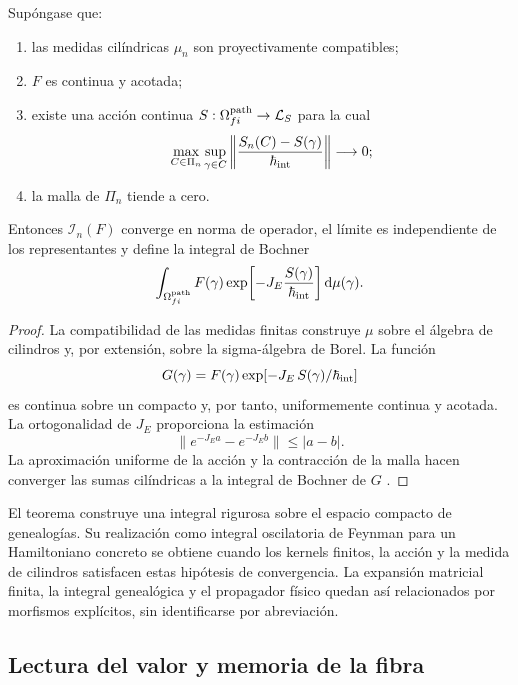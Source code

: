 \begin{theorem}
\label{x_reciprocidad:thm:integral-genealogica-caminos-rev2}
Supóngase que:
\begin{enumerate}
 \item las medidas cilíndricas \(\mu_n\) son proyectivamente compatibles;
 \item \(F\) es continua y acotada;
 \item existe una acción continua
 \(S:\Omega^{\rm path}_{fi}\to\mathcal L_S\) para la cual
 \[
  \max_{C\in\Pi_n}\sup_{\gamma\in C}
  \left\|\frac{S_n(C)-S(\gamma)}{\hbar_{\rm int}}\right\|
  \longrightarrow0;
 \]
 \item la malla de \(\Pi_n\) tiende a cero.
\end{enumerate}
Entonces \(\mathcal I_n(F)\) converge en norma de operador, el límite es
independiente de los representantes y define la integral de Bochner
\begin{equation}
 \int_{\Omega^{\rm path}_{fi}}
 F(\gamma)
 \exp\!\left[-J_E\frac{S(\gamma)}{\hbar_{\rm int}}\right]
 \mathrm d\mu(\gamma).
 \label{x_reciprocidad:eq:integral-genealogica-caminos-rev2}
\end{equation}
\end{theorem}

\begin{proof}
La compatibilidad de las medidas finitas construye \(\mu\) sobre el álgebra
de cilindros y, por extensión, sobre la sigma-álgebra de Borel. La función
\[
 G(\gamma)=F(\gamma)
 \exp[-J_E\,S(\gamma)/\hbar_{\rm int}]
\]
es continua sobre un compacto y, por tanto, uniformemente continua y
acotada. La ortogonalidad de \(J_E\) proporciona la estimación
\[
 \|e^{-J_E a}-e^{-J_E b}\|\leq |a-b|.
\]
La aproximación uniforme de la acción y la contracción de la malla hacen
converger las sumas cilíndricas a la integral de Bochner de \(G\)
\cite{x_reciprocidad:Bochner1955}.
\end{proof}

El teorema construye una integral rigurosa sobre el espacio compacto de
genealogías. Su realización como integral oscilatoria de Feynman para un
Hamiltoniano concreto se obtiene cuando los kernels finitos, la acción y la
medida de cilindros satisfacen estas hipótesis de convergencia. La expansión
matricial finita, la integral genealógica y el propagador físico quedan así
relacionados por morfismos explícitos, sin identificarse por abreviación.

\subsection{Lectura del valor y memoria de la fibra}

